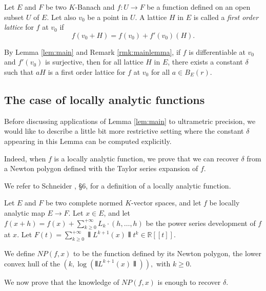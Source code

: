 \documentclass{lms}
\begin{document}
\begin{deftn}
\label{def:firstorder}
Let $E$ and $F$ be two $K$-Banach and $f : U \rightarrow F$ be a 
function defined on an open subset $U$ of $E$. Let also $v_0$ be a 
point in $U$.
A lattice $H$ in $E$ is called a \emph{first order lattice} for $f$ at 
$v_0$ if
$$f(v_0 + H) = f(v_0) + f'(v_0) (H).$$
\end{deftn}

By Lemma \ref{lem:main} and Remark \ref{rmk:mainlemma}, if $f$ is 
differentiable at $v_0$ and $f'(v_0)$ is surjective, then for all 
lattice $H$ in $E$, there exists a constant $\delta$ such that $aH$ 
is a first order lattice for $f$ at $v_0$ for all $a \in B_E(r)$.

\subsection{The case of locally analytic functions}
\label{ssec:locanalytic}


Before discussing applications of Lemma \ref{lem:main} to ultrametric 
precision, we would like to describe a little bit more restrictive 
setting where the constant $\delta$ appearing in this Lemma can be 
computed explicitly.


Indeed, when $f$ is a locally analytic function, we prove that we can recover $\delta$ from a Newton polygon defined with the Taylor series expansion of $f.$

We refer to Schneider \cite{Schneider}, \S 6, for a definition of a 
locally analytic function.

\begin{deftn}\label{deftn:analyticNP}
Let $E$ and $F$ be two complete normed $K$-vector spaces, and let $f$ be locally analytic map $E \rightarrow F$.  Let $x \in E$, and let $f(x+h)=f(x)+\sum_{k \geq 0}^{+\infty} L_k \cdot (h,\dots,h)$ be the power series development of $f$ at $x$.
Let $F(t) = \sum_{k\geq 0}^{+\infty} \interleave L^{k+1}(x) \interleave  t^k \in \mathbb{R}[[t]].$

We define $NP(f,x)$ to be the function defined by its Newton polygon, the lower convex hull of the $(k,\log ( \interleave L^{k+1}(x) \interleave)),$ with $k \geq 0.$
\end{deftn}

We now prove that the knowledge of $NP(f,x)$ is enough to recover $\delta$.
\end{document}
